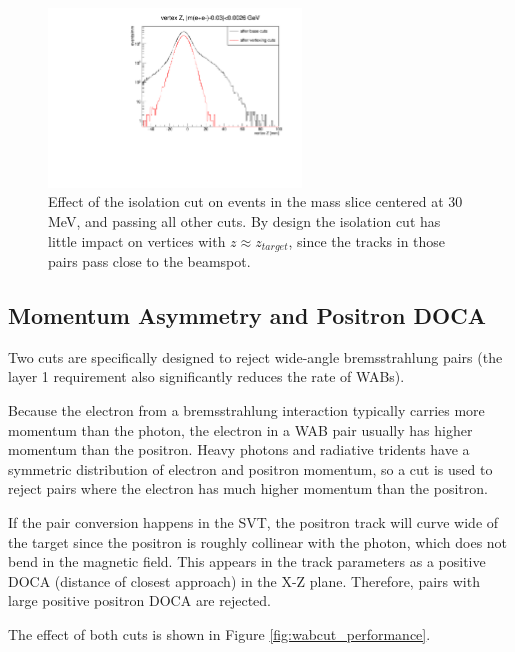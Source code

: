 \begin{figure}[ht]
\begin{center}
    \includegraphics[width=0.6\textwidth,page=5,angle=-90]{vertexing/figs/vertcutplots}
\end{center}
    \caption{Effect of the isolation cut on events in the mass slice centered at 30 MeV, and passing all other cuts.
    By design the isolation cut has little impact on vertices with $z\approx z_{target}$, since the tracks in those pairs pass close to the beamspot.
    }
    \label{fig:isolation_performance}
\end{figure}

\subsection{Momentum Asymmetry and Positron DOCA}
Two cuts are specifically designed to reject wide-angle bremsstrahlung pairs (the layer 1 requirement also significantly reduces the rate of WABs).

Because the electron from a bremsstrahlung interaction typically carries more momentum than the photon, the electron in a WAB pair usually has higher momentum than the positron.
Heavy photons and radiative tridents have a symmetric distribution of electron and positron momentum, so a cut is used to reject pairs where the electron has much higher momentum than the positron.

If the pair conversion happens in the SVT, the positron track will curve wide of the target since the positron is roughly collinear with the photon, which does not bend in the magnetic field.
This appears in the track parameters as a positive DOCA (distance of closest approach) in the X-Z plane.
Therefore, pairs with large positive positron DOCA are rejected.

The effect of both cuts is shown in Figure \ref{fig:wabcut_performance}.

